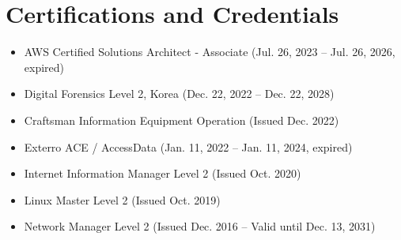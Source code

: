 \documentclass[letterpaper,11pt]{article}
\newcommand{\resumeItem}[1]{
  \item\small{{#1 \vspace{-2pt}}}
}
\newcommand{\resumeSubHeadingListStart}{\begin{itemize}[leftmargin=*]}
\newcommand{\resumeSubHeadingListEnd}{\end{itemize}}
\begin{document}
\section{Certifications and Credentials}
  \resumeSubHeadingListStart
    \resumeItem{AWS Certified Solutions Architect - Associate (Jul. 26, 2023 -- Jul. 26, 2026, expired)}
    \resumeItem{Digital Forensics Level 2, Korea (Dec. 22, 2022 -- Dec. 22, 2028)}
    \resumeItem{Craftsman Information Equipment Operation (Issued Dec. 2022)}
    \resumeItem{Exterro ACE / AccessData (Jan. 11, 2022 -- Jan. 11, 2024, expired)}
    \resumeItem{Internet Information Manager Level 2 (Issued Oct. 2020)}
    \resumeItem{Linux Master Level 2 (Issued Oct. 2019)}
    \resumeItem{Network Manager Level 2 (Issued Dec. 2016 -- Valid until Dec. 13, 2031)}
  \resumeSubHeadingListEnd
\end{document}

